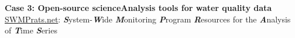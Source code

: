 \documentclass[serif]{beamer}\usepackage[]{graphicx}\usepackage[]{color}
\newcommand{\emtxt}[1]{\textbf{\textit{#1}}}
\begin{document}
\begin{frame}{\textbf{Case 3: Open-source science}}{\textbf{Analysis tools for water quality data}}
\href{https://swmprats.net}{SWMPrats.net}: \emtxt{S}ystem-\emtxt{W}ide \emtxt{M}onitoring \emtxt{P}rogram \emtxt{R}esources for the \emtxt{A}nalysis of \emtxt{T}ime \emtxt{S}eries \\~\\
\centerline{}
\end{frame}
\end{document}
